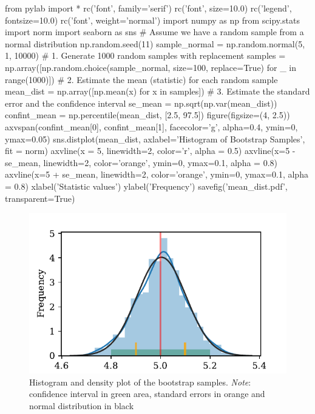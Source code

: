 \documentclass[11pt]{article}
\begin{document}
\begin{pycode}
from pylab import *
rc('font', family='serif')
rc('font', size=10.0)
rc('legend', fontsize=10.0)
rc('font', weight='normal')
import numpy as np
from scipy.stats import norm
import seaborn as sns
# Assume we have a random sample from a normal distribution
np.random.seed(11)
sample_normal = np.random.normal(5, 1, 10000)
# 1. Generate 1000 random samples with replacement
samples = np.array([np.random.choice(sample_normal,
                    size=100, replace=True) for _ in range(1000)])
# 2. Estimate the mean (statistic) for each random sample
mean_dist = np.array([np.mean(x) for x in samples])
# 3. Estimate the standard error and the confidence interval
se_mean = np.sqrt(np.var(mean_dist))
confint_mean = np.percentile(mean_dist, [2.5, 97.5])
figure(figsize=(4, 2.5))
axvspan(confint_mean[0], confint_mean[1], facecolor='g', alpha=0.4, ymin=0, ymax=0.05)
sns.distplot(mean_dist, axlabel='Histogram of Bootstrap Samples', fit = norm)
axvline(x = 5, linewidth=2, color='r', alpha = 0.5)
axvline(x=5 - se_mean, linewidth=2, color='orange', ymin=0, ymax=0.1, alpha = 0.8)
axvline(x=5 + se_mean, linewidth=2, color='orange', ymin=0, ymax=0.1, alpha = 0.8)
xlabel('Statistic values')
ylabel('Frequency')
savefig('mean_dist.pdf', transparent=True)
\end{pycode}

\begin{figure}[H]
    \begin{center}
        \includegraphics{mean_dist.pdf}
    \end{center}
    \caption{Histogram and density plot of the bootstrap samples. \textit{Note}:
    confidence interval in green area, standard errors in orange and normal distribution in black}\label{fig:BootsExample}
\end{figure}
\end{document}
